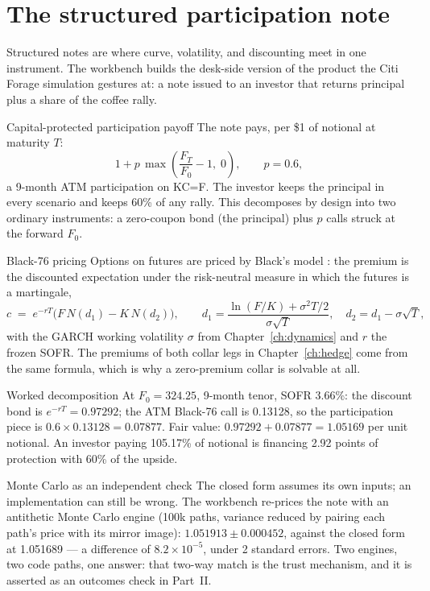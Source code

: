 \documentclass[11pt,a4paper]{article}
\newcommand{\usd}{\$}
\begin{document}
\section{The structured participation note}
\label{ch:note}

Structured notes are where curve, volatility, and discounting meet in one
instrument. The workbench builds the desk-side version of the product the
Citi Forage simulation gestures at: a note issued to an investor that
returns principal plus a share of the coffee rally.

\begin{concept}{Capital-protected participation payoff}
The note pays, per \usd{}1 of notional at maturity $T$:
\[
  1 + p\,\max\!\left(\frac{F_T}{F_0}-1,\;0\right),
  \qquad p = 0.6,
\]
a 9-month ATM participation on KC=F. The investor keeps the principal in
every scenario and keeps 60\% of any rally. This decomposes by design
into two ordinary instruments: a zero-coupon bond (the principal) plus
$p$ calls struck at the forward $F_0$.
\end{concept}

\begin{concept}{Black-76 pricing}
Options on futures are priced by Black's model \cite{black76}: the
premium is the discounted expectation under the risk-neutral measure in
which the futures is a martingale,
\[
  c \;=\; e^{-rT}\bigl(F\,N(d_1) - K\,N(d_2)\bigr), \qquad
  d_1 = \frac{\ln(F/K) + \sigma^2 T/2}{\sigma\sqrt{T}}, \quad
  d_2 = d_1 - \sigma\sqrt{T},
\]
with the GARCH working volatility $\sigma$ from
Chapter~\ref{ch:dynamics} and $r$ the frozen SOFR. The premiums of both
collar legs in Chapter~\ref{ch:hedge} come from the same formula, which
is why a zero-premium collar is solvable at all.
\end{concept}

\begin{concept}{Worked decomposition}
At $F_0 = 324.25$, 9-month tenor, SOFR 3.66\%: the discount bond is
$e^{-rT} = 0.97292$; the ATM Black-76 call is 0.13128, so the
participation piece is $0.6 \times 0.13128 = 0.07877$. Fair value:
$0.97292 + 0.07877 = 1.05169$ per unit notional. An investor paying
105.17\% of notional is financing 2.92 points of protection with 60\% of
the upside.
\end{concept}

\begin{concept}{Monte Carlo as an independent check}
The closed form assumes its own inputs; an implementation can still be
wrong. The workbench re-prices the note with an antithetic Monte Carlo
engine (100k paths, variance reduced by pairing each path's price with
its mirror image): $1.051913 \pm 0.000452$, against the closed form at
1.051689 --- a difference of $8.2\times10^{-5}$, under 2 standard errors.
Two engines, two code paths, one answer: that two-way match is the trust
mechanism, and it is asserted as an outcomes check in Part~II.
\end{concept}
\end{document}
